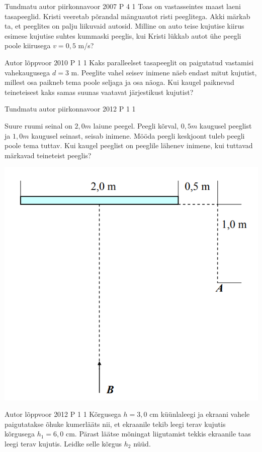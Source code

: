 \documentclass[11pt]{article}
\begin{document}
{%
{Tundmatu autor} %
{piirkonnavoor} %
{2007} %
{P 4} %
{1} %
{
\ifStatement
 Toas on vastasseintes maast laeni tasapeeglid. Kristi veeretab põrandal mänguautot risti peeglitega. Akki märkab ta, et peeglites on palju liikuvaid autosid. Milline on auto teise kujutise kiirus esimese kujutise suhtes kummaski peeglis, kui Kristi lükkab autot ühe peegli poole kiirusega $v = 0,5$ m/s?
\fi
}


{Autor} %
{lõppvoor} %
{2010} %
{P 1} %
{1} %
{
\ifStatement
Kaks paralleelset tasapeeglit on paigutatud vastamisi vahekaugusega $d = 3$ m. Peeglite vahel seisev inimene näeb endast mitut kujutist, millest osa paikneb tema poole seljaga ja osa näoga. Kui kaugel paiknevad teineteisest kaks samas suunas vaatavat järjestikust kujutist?
\fi
}


{Tundmatu autor} %
{piirkonnavoor} %
{2012} %
{P 1} %
{1} %
{
\ifStatement
Suure ruumi seinal on $2,0 m$ laiune peegel. Peegli kõrval, $0,5 m$ kaugusel peeglist ja $1,0 m$ kaugusel seinast, seisab inimene. Mööda peegli keskjoont tuleb peegli poole tema tuttav. Kui kaugel peeglist on peeglile lähenev inimene, kui tuttavad märkavad teineteist peeglis?
\begin{center}
	\includegraphics[width=0.5\linewidth]{2012-v2p-01-yl.PNG}
\end{center}
\fi
}


{Autor} %
{lõppvoor} %
{2012} %
{P 1} %
{1} %
{
\ifStatement
Kõrgusega $h = 3,0$ cm küünlaleegi ja ekraani vahele paigutatakse õhuke kumerlääts nii, et ekraanile tekib leegi terav kujutis kõrgusega $h_1 = 6,0$ cm. Pärast läätse mõningat liigutamist tekkis ekraanile taas leegi terav kujutis. Leidke selle kõrgus $h_2$ nüüd.
\fi
}

}
\end{document}
